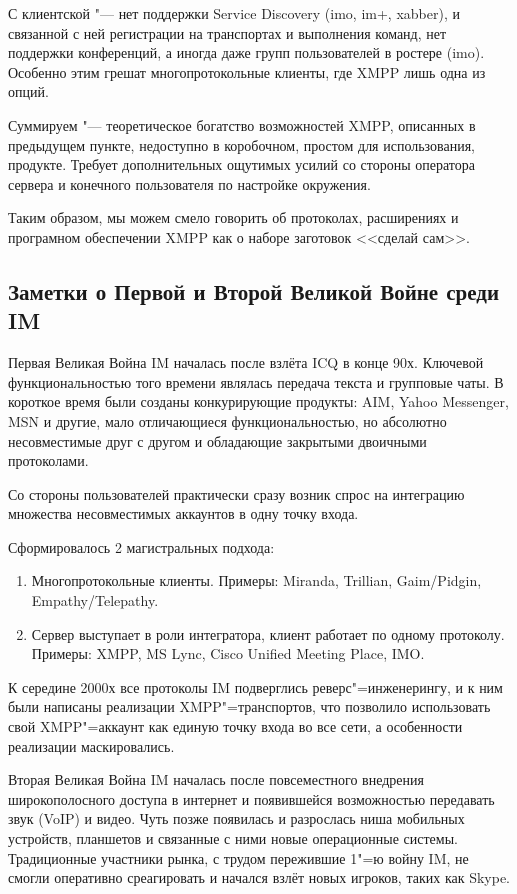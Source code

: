 \documentclass[10pt, a5paper]{article}
\begin{document}
С клиентской "--- нет поддержки Service Discovery (imo, im+, \linebreak xabber), и связанной с ней регистрации на транспортах и выполнения команд, нет поддержки конференций, а иногда даже групп пользователей в ростере (imo). Особенно этим грешат многопротокольные клиенты, где XMPP лишь одна из опций.

Суммируем "--- теоретическое богатство возможностей XMPP, \linebreak описанных в предыдущем пункте, недоступно в коробочном, простом для использования, продукте. Требует дополнительных ощутимых усилий со стороны оператора сервера и конечного пользователя по настройке окружения.

Таким образом, мы можем смело говорить об протоколах, расширениях  и програмном обеспечении XMPP как о наборе заготовок <<сделай сам>>.

\subsection*{Заметки о Первой и Второй Великой Войне среди IM}

Первая Великая Война IM началась после взлёта ICQ в конце 90х. Ключевой функциональностью того времени являлась передача текста и групповые чаты.  В короткое время были созданы конкурирующие продукты: AIM, Yahoo Messenger, MSN и другие, мало отличающиеся функциональностью, но абсолютно несовместимые друг с другом и обладающие закрытыми двоичными протоколами.

Со стороны пользователей практически сразу возник спрос на интеграцию множества несовместимых аккаунтов в одну точку входа.

Сформировалось 2 магистральных подхода:

\begin{enumerate}
  \item Многопротокольные клиенты. Примеры: Miranda, Trillian, Gaim/Pidgin, Empathy/Telepathy.
  \item Сервер выступает в роли интегратора, клиент работает по одному протоколу. Примеры: XMPP, MS Lync, Cisco Unified Meeting Place, IMO.
\end{enumerate}

К середине 2000х все  протоколы IM подверглись реверс"=инженерингу, и к ним были написаны реализации XMPP"=транспортов, что позволило использовать свой XMPP"=аккаунт как единую точку входа во все сети, а особенности реализации маскировались.

Вторая Великая Война IM началась после повсеместного внедрения широкополосного доступа в интернет и появившейся возможностью передавать звук (VoIP) и видео. Чуть позже появилась и разрослась ниша мобильных устройств, планшетов и связанные с ними новые операционные системы. Традиционные участники рынка,  с трудом пережившие 1"=ю войну IM, не смогли оперативно среагировать и начался взлёт новых игроков, таких как Skype.
\end{document}
